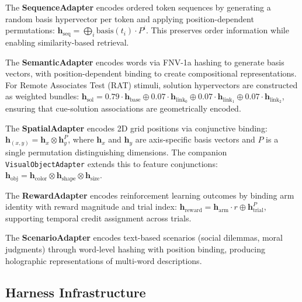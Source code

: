 \documentclass[11pt,letterpaper]{article}
\newcommand{\hv}{\mathbf{h}}
\newcommand{\bind}{\otimes}
\begin{document}
The \textbf{SequenceAdapter} encodes ordered token sequences by generating a random basis hypervector per token and applying position-dependent permutations: $\hv_{\text{seq}} = \bigoplus_i \text{basis}(t_i) \cdot P^i$. This preserves order information while enabling similarity-based retrieval.

The \textbf{SemanticAdapter} encodes words via FNV-1a hashing to generate basis vectors, with position-dependent binding to create compositional representations. For Remote Associates Test (RAT) stimuli, solution hypervectors are constructed as weighted bundles: $\hv_{\text{sol}} = 0.79 \cdot \hv_{\text{base}} \oplus 0.07 \cdot \hv_{\text{link}_0} \oplus 0.07 \cdot \hv_{\text{link}_1} \oplus 0.07 \cdot \hv_{\text{link}_2}$, ensuring that cue-solution associations are geometrically encoded.

The \textbf{SpatialAdapter} encodes 2D grid positions via conjunctive binding: $\hv_{(x,y)} = \hv_x \bind \hv_y^P$, where $\hv_x$ and $\hv_y$ are axis-specific basis vectors and $P$ is a single permutation distinguishing dimensions. The companion \texttt{VisualObjectAdapter} extends this to feature conjunctions: $\hv_{\text{obj}} = \hv_{\text{color}} \bind \hv_{\text{shape}} \bind \hv_{\text{size}}$.

The \textbf{RewardAdapter} encodes reinforcement learning outcomes by binding arm identity with reward magnitude and trial index: $\hv_{\text{reward}} = \hv_{\text{arm}} \cdot r \oplus \hv_{\text{trial}}^P$, supporting temporal credit assignment across trials.

The \textbf{ScenarioAdapter} encodes text-based scenarios (social dilemmas, moral judgments) through word-level hashing with position binding, producing holographic representations of multi-word descriptions.

\subsection{Harness Infrastructure}
\end{document}
